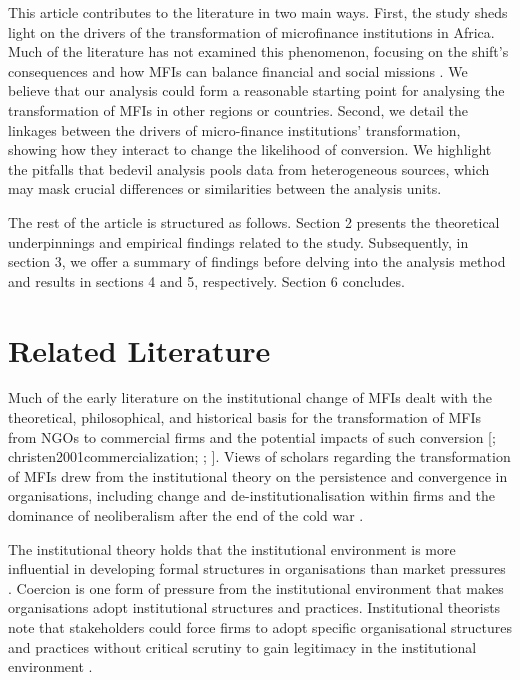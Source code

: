 \documentclass[a4paper,nobind]{templates/ociamthesis}
\begin{document}
This article contributes to the literature in two main ways. First, the study sheds light on the drivers of the transformation of microfinance institutions in Africa. Much of the literature has not examined this phenomenon, focusing on the shift's consequences and how MFIs can balance financial and social missions \autocite{d2013unsubsidized,forkusam2014does,mia2017mission}. We believe that our analysis could form a reasonable starting point for analysing the transformation of MFIs in other regions or countries. Second, we detail the linkages between the drivers of micro-finance institutions' transformation, showing how they interact to change the likelihood of conversion. We highlight the pitfalls that bedevil analysis pools data from heterogeneous sources, which may mask crucial differences or similarities between the analysis units.

The rest of the article is structured as follows. Section 2 presents the theoretical underpinnings and empirical findings related to the study. Subsequently, in section 3, we offer a summary of findings before delving into the analysis method and results in sections 4 and 5, respectively. Section 6 concludes.

\hypertarget{related-literature}{%
\section{Related Literature}\label{related-literature}}

Much of the early literature on the institutional change of MFIs dealt with the theoretical, philosophical, and historical basis for the transformation of MFIs from NGOs to commercial firms and the potential impacts of such conversion {[}\textcite{campion1999institutional}; christen2001commercialization; \textcite{gutierrez201920}; \textcite{zaby2019science}{]}. Views of scholars regarding the transformation of MFIs drew from the institutional theory on the persistence and convergence in organisations, including change and de-institutionalisation within firms \autocite{scott2004institutional} and the dominance of neoliberalism after the end of the cold war \autocite{ostry2017}.

The institutional theory holds that the institutional environment is more influential in developing formal structures in organisations than market pressures \autocite{maggio1991}. Coercion is one form of pressure from the institutional environment that makes organisations adopt institutional structures and practices. Institutional theorists note that stakeholders could force firms to adopt specific organisational structures and practices without critical scrutiny to gain legitimacy in the institutional environment \autocite{scott2004institutional,martinez2017coercive}.
\end{document}
